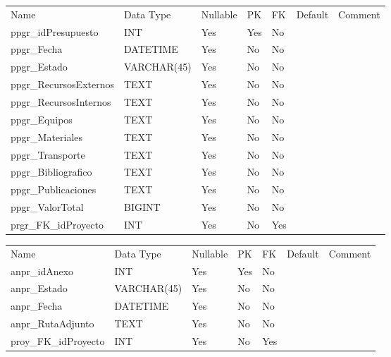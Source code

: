 			\begin{center}
				\begin{tabular}{ |l|l|l|l|l|l|l| }
					\hline
					Name & Data Type & Nullable & PK & FK & Default & Comment \\
					ppgr_idPresupuesto & INT & Yes & Yes & No &  & \\ \hline 
ppgr_Fecha & DATETIME & Yes & No & No &  & \\ \hline 
ppgr_Estado & VARCHAR(45) & Yes & No & No &  & \\ \hline 
ppgr_RecursosExternos & TEXT & Yes & No & No &  & \\ \hline 
ppgr_RecursosInternos & TEXT & Yes & No & No &  & \\ \hline 
ppgr_Equipos & TEXT & Yes & No & No &  & \\ \hline 
ppgr_Materiales & TEXT & Yes & No & No &  & \\ \hline 
ppgr_Transporte & TEXT & Yes & No & No &  & \\ \hline 
ppgr_Bibliografico & TEXT & Yes & No & No &  & \\ \hline 
ppgr_Publicaciones & TEXT & Yes & No & No &  & \\ \hline 
ppgr_ValorTotal & BIGINT & Yes & No & No &  & \\ \hline 
prgr_FK_idProyecto & INT & Yes & No & Yes &  & \\ \hline 

				\end{tabular}
			\end{center}
		

			\begin{center}
				\begin{tabular}{ |l|l|l|l|l|l|l| }
					\hline
					Name & Data Type & Nullable & PK & FK & Default & Comment \\
					anpr_idAnexo & INT & Yes & Yes & No &  & \\ \hline 
anpr_Estado & VARCHAR(45) & Yes & No & No &  & \\ \hline 
anpr_Fecha & DATETIME & Yes & No & No &  & \\ \hline 
anpr_RutaAdjunto & TEXT & Yes & No & No &  & \\ \hline 
proy_FK_idProyecto & INT & Yes & No & Yes &  & \\ \hline 

				\end{tabular}
			\end{center}
		

